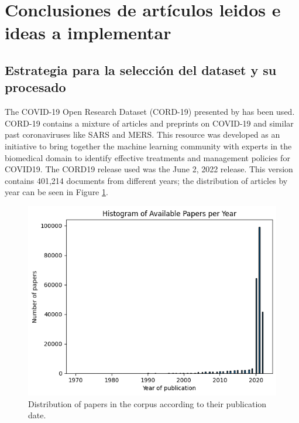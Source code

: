\documentclass[a4paper,10pt]{article}
\title{}
\author{}
\begin{document}
\maketitle

\begin{abstract}

\end{abstract}

\section{Conclusiones de artículos leidos e ideas a implementar}

\subsection{Estrategia para la selección del dataset y su procesado}

The COVID-19 Open Research Dataset (CORD-19) presented by \cite{CORD19} has been used. CORD-19 contains a mixture of articles and preprints on COVID-19 and similar past coronaviruses like SARS and MERS. This resource was developed as an initiative to bring together the machine learning community with experts in the biomedical domain to identify effective treatments and management policies for COVID19. The CORD19 release used was the June 2, 2022 release. This version contains 401,214 documents from different years; the distribution of articles by year can be seen in Figure \ref{fig:Histogram_Available_Papers_Year}.

\begin{figure}[H]
    \centering
    \includegraphics[width=0.8\linewidth]{fig/Histogram_Available_Papers_Year.png}
    \caption{\centering Distribution of papers in the corpus according to their publication date.}
    \label{fig:Histogram_Available_Papers_Year}
\end{figure}
\end{document}
